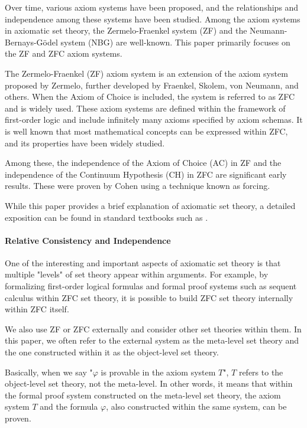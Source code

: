 \documentclass{report}
\begin{document}
Over time, various axiom systems have been proposed, 
and the relationships and independence among these systems have been studied. 
Among the axiom systems in axiomatic set theory, 
the Zermelo-Fraenkel system (ZF) and the Neumann-Bernays-Gödel system (NBG) are well-known. 
This paper primarily focuses on the ZF and ZFC axiom systems.

The Zermelo-Fraenkel (ZF) axiom system is an extension of the axiom system proposed by Zermelo, 
further developed by Fraenkel, Skolem, von Neumann, and others. 
When the Axiom of Choice is included, the system is referred to as ZFC and is widely used. 
These axiom systems are defined within the framework of first-order logic 
and include infinitely many axioms specified by axiom schemas.
It is well known that most mathematical concepts can be expressed within ZFC, 
and its properties have been widely studied.

Among these, the independence of the Axiom of Choice (AC) in ZF 
and the independence of the Continuum Hypothesis (CH) in ZFC are significant early results. 
These were proven by Cohen using a technique known as forcing.

While this paper provides a brief explanation of axiomatic set theory, 
a detailed exposition can be found in standard textbooks such as \cite{kunen2011,jech_set_theory}.

\paragraph{Relative Consistency and Independence}

One of the interesting and important aspects of axiomatic set theory is that 
multiple "levels" of set theory appear within arguments.
For example, by formalizing first-order logical formulas and formal proof systems such as sequent calculus within ZFC set theory, 
it is possible to build ZFC set theory internally within ZFC itself.

We also use ZF or ZFC externally and consider other set theories within them. 
In this paper, we often refer to the external system as the meta-level set theory 
and the one constructed within it as the object-level set theory.

Basically, when we say "$\varphi$ is provable in the axiom system $T$", $T$ refers to the object-level set theory, not the meta-level. 
In other words, it means that within the formal proof system constructed on the meta-level set theory, the axiom system 
$T$ and the formula $\varphi$, also constructed within the same system, can be proven.
\end{document}
